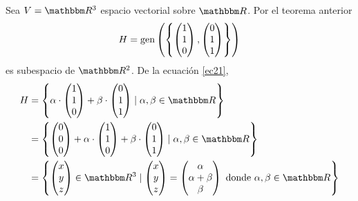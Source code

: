 \begin{example}
    Sea $V = \RR[3]$ espacio vectorial  sobre $\RR$. Por el teorema anterior
    \begin{equation}
        H = \operatorname{gen} \left( \left\{ \begin{pmatrix} 1 \\ 1 \\ 0 \end{pmatrix},  \begin{pmatrix} 0 \\ 1 \\ 1 \end{pmatrix} \right\} \right) \label{ec21}
    \end{equation}
    es subespacio de $\RR[2]$. De la ecuación \eqref{ec21},
    \begin{align*}
        H & = \left\{ \alpha \cdot \begin{pmatrix} 1 \\ 1 \\ 0 \end{pmatrix} + \beta \cdot \begin{pmatrix} 0 \\ 1 \\ 1 \end{pmatrix} \mid \alpha,  \beta \in \RR \right\} \\
        & = \left\{ \begin{pmatrix} 0 \\ 0 \\ 0 \end{pmatrix} + \alpha \cdot \begin{pmatrix} 1 \\ 1 \\ 0 \end{pmatrix} + \beta \cdot \begin{pmatrix} 0 \\ 1 \\ 1 \end{pmatrix} \mid \alpha,  \beta \in \RR \right\} \\
        & = \left\{ \begin{pmatrix} x \\ y \\ z \end{pmatrix} \in \RR[3] \mid \begin{pmatrix} x \\ y \\ z \end{pmatrix} = \begin{pmatrix} \alpha \\ \alpha + \beta \\ \beta \end{pmatrix} \text{ donde } \alpha,  \beta \in \RR \right\}

\end{align*}
\end{example}
